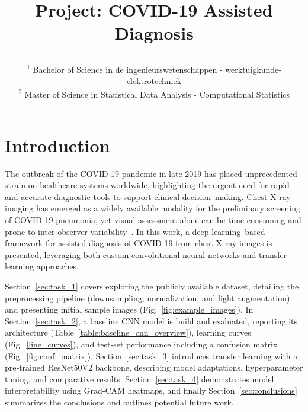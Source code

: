 \documentclass[conference]{IEEEtran}
\begin{document}
\title{Project: COVID-19 Assisted Diagnosis\\

\author{
\and
{}
\and
{}
\and
{}
\and

\textsuperscript{1} Bachelor of Science in de ingenieurswetenschappen - werktuigkunde-elektrotechniek \hfill\\
\textsuperscript{2} Master of Science in Statistical Data Analysis - Computational Statistics\hfill\\}
}
\maketitle

\section{Introduction}
The outbreak of the COVID-19 pandemic in late 2019 has placed unprecedented strain on healthcare systems worldwide, highlighting the urgent need for rapid and accurate diagnostic tools to support clinical decision–making. Chest X‑ray imaging has emerged as a widely available modality for the preliminary screening of COVID‑19 pneumonia, yet visual assessment alone can be time‑consuming and prone to inter‑observer variability~\cite{b1,b2}. In this work, a deep learning–based framework for assisted diagnosis of COVID‑19 from chest X‑ray images is presented, leveraging both custom convolutional neural networks and transfer learning approaches.

Section~\ref{sec:task_1} covers exploring the publicly available dataset, detailing the preprocessing pipeline (downsampling, normalization, and light augmentation) and presenting initial sample images (Fig.~\ref{fig:example_images}). In Section~\ref{sec:task_2}, a baseline CNN model is build and evaluated, reporting its architecture (Table~\ref{table:baseline_cnn_overview}), learning curves (Fig.~\ref{line_curves}), and test‑set performance including a confusion matrix (Fig.~\ref{fig:conf_matrix}). Section~\ref{sec:task_3} introduces transfer learning with a pre‑trained ResNet50V2 backbone, describing model adaptations, hyperparameter tuning, and comparative results. Section~\ref{sec:task_4} demonstrates model interpretability using Grad‑CAM heatmaps, and finally Section~\ref{sec:conclusions} summarizes the conclusions and outlines potential future work.
\end{document}
